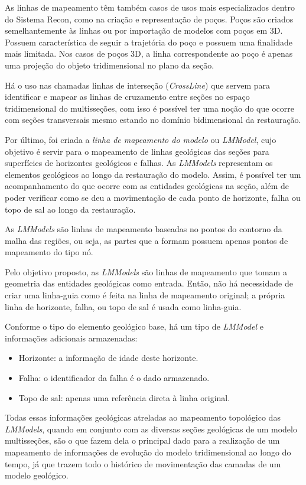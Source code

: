 As linhas de mapeamento têm também casos de usos mais especializados dentro do Sistema Recon, como na criação e representação de poços. Poços são criados semelhantemente às linhas ou por importação de modelos com poços em 3D. Possuem característica de seguir a trajetória do poço e possuem uma finalidade mais limitada. Nos casos de poços 3D, a linha correspondente ao poço é apenas uma projeção do objeto tridimensional no plano da seção.

Há o uso nas chamadas linhas de interseção (\textit{CrossLine}) que servem para identificar e mapear as linhas de cruzamento entre seções no espaço tridimensional do multisseções, com isso é possível ter uma noção do que ocorre com seções transversais mesmo estando no domínio bidimensional da restauração.

Por último, foi criada a \textit{linha de mapeamento do modelo} ou \textit{LMModel}, cujo objetivo é servir para o mapeamento de linhas geológicas das seções para superfícies de horizontes geológicos e falhas. As \emph{LMModels} representam os elementos geológicos ao longo da restauração do modelo. Assim, é possível ter um acompanhamento do que ocorre com as entidades geológicas na seção, além de poder verificar como se deu a movimentação de cada ponto de horizonte, falha ou topo de sal ao longo da restauração.

As \textit{LMModels} são linhas de mapeamento baseadas no pontos do contorno da malha das regiões, ou seja, as partes que a formam possuem apenas pontos de mapeamento do tipo nó.

Pelo objetivo proposto, as \textit{LMModels} são linhas de mapeamento que tomam a geometria das entidades geológicas como entrada. Então, não há necessidade de criar uma linha-guia como é feita na linha de mapeamento original; a própria linha de horizonte, falha, ou topo de sal é usada como linha-guia.

Conforme o tipo do elemento geológico base, há um tipo de \textit{LMModel} e informações adicionais armazenadas:

\renewcommand{\labelitemi}{•}
\begin{itemize}
  \item Horizonte: a informação de idade deste horizonte.
  \item Falha: o identificador da falha é o dado armazenado.
  \item Topo de sal: apenas uma referência direta à linha original.
\end{itemize}

Todas essas informações  geológicas atreladas ao mapeamento topológico das \textit{LMModels}, quando em conjunto com as diversas seções geológicas de um modelo multisseções, são o que fazem dela o principal dado para a realização de um mapeamento de informações de evolução do modelo tridimensional ao longo do tempo, já que trazem todo o histórico de movimentação das camadas de um modelo geológico.

